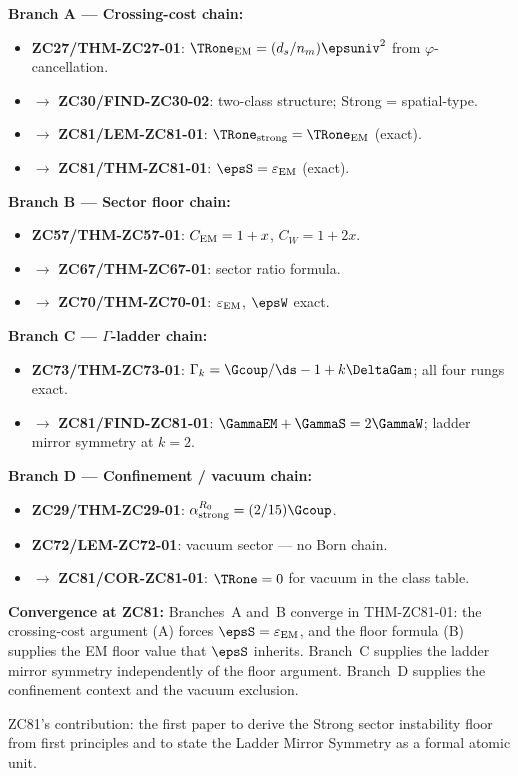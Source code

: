 \documentclass[12pt, a4paper]{article}
\renewcommand{\epsEM}{\varepsilon_{\rm EM}}
\begin{document}
\begin{genealogybox}[title={How ZC81's Key Objects Trace Back}]

\textbf{Branch A --- Crossing-cost chain:}
\begin{itemize}[leftmargin=2em, noitemsep]
  \item \textbf{ZC27/THM-ZC27-01}: $\TRone_{\rm EM} = (d_s/n_m)\epsuniv^2$
    from $\varphi$-cancellation.
  \item $\to$ \textbf{ZC30/FIND-ZC30-02}: two-class structure;
    Strong = spatial-type.
  \item $\to$ \textbf{ZC81/LEM-ZC81-01}: $\TRone_{\rm strong} =
    \TRone_{\rm EM}$ (exact).
  \item $\to$ \textbf{ZC81/THM-ZC81-01}: $\epsS = \epsEM$ (exact).
\end{itemize}

\textbf{Branch B --- Sector floor chain:}
\begin{itemize}[leftmargin=2em, noitemsep]
  \item \textbf{ZC57/THM-ZC57-01}: $C_{\rm EM} = 1+x$,
    $C_W = 1+2x$.
  \item $\to$ \textbf{ZC67/THM-ZC67-01}: sector ratio formula.
  \item $\to$ \textbf{ZC70/THM-ZC70-01}: $\epsEM$, $\epsW$ exact.
\end{itemize}

\textbf{Branch C --- $\Gamma$-ladder chain:}
\begin{itemize}[leftmargin=2em, noitemsep]
  \item \textbf{ZC73/THM-ZC73-01}: $\Gamma_k = \Gcoup/\ds -
    1 + k\DeltaGam$; all four rungs exact.
  \item $\to$ \textbf{ZC81/FIND-ZC81-01}: $\GammaEM + \GammaS =
    2\GammaW$; ladder mirror symmetry at $k=2$.
\end{itemize}

\textbf{Branch D --- Confinement / vacuum chain:}
\begin{itemize}[leftmargin=2em, noitemsep]
  \item \textbf{ZC29/THM-ZC29-01}: $\alpha_{\rm strong}^{R_0} =
    (2/15)\Gcoup$.
  \item \textbf{ZC72/LEM-ZC72-01}: vacuum sector --- no Born chain.
  \item $\to$ \textbf{ZC81/COR-ZC81-01}: $\TRone = 0$ for vacuum
    in the class table.
\end{itemize}

\textbf{Convergence at ZC81:}
Branches~A and~B converge in THM-ZC81-01: the crossing-cost
argument (A) forces $\epsS = \epsEM$, and the floor formula (B)
supplies the EM floor value that $\epsS$ inherits.
Branch~C supplies the ladder mirror symmetry independently of the
floor argument.
Branch~D supplies the confinement context and the vacuum exclusion.

ZC81's contribution: the first paper to derive the Strong sector
instability floor from first principles and to state the Ladder
Mirror Symmetry as a formal atomic unit.
\end{genealogybox}
\end{document}
